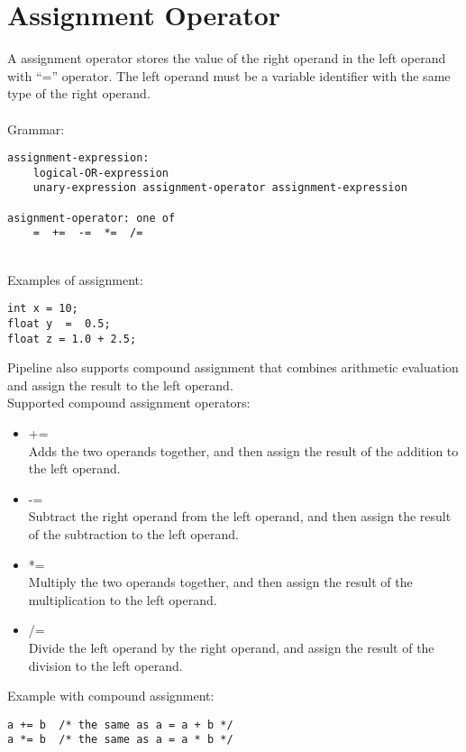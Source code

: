 \documentclass[./LRM_main.tex]{subfiles}
\begin{document}
\section{Assignment Operator}
A assignment operator stores the value of the right operand in the left operand with “=” operator. The left operand must be a variable identifier with the same type of the right operand.\\
\vspace{1 mm}\\
Grammar:
\begin{lstlisting}
assignment-expression:
    logical-OR-expression
    unary-expression assignment-operator assignment-expression
    
asignment-operator: one of
    =  +=  -=  *=  /=
\end{lstlisting}
\vspace{1 mm}\\
Examples of assignment:
\begin{lstlisting}
int x = 10; 
float y  =  0.5;  
float z = 1.0 + 2.5;
\end{lstlisting}	
Pipeline also supports compound assignment that combines arithmetic evaluation and assign the result to the left operand. \\
Supported compound assignment operators: \\
\begin{itemize}
\item +=\\
Adds the two operands together, and then assign the result of the addition to the left operand.\\
\item -=\\
Subtract the right operand from the left operand, and then assign the result of the subtraction to the left operand.\\
\item *=\\
Multiply the two operands together, and then assign the result of the multiplication to the left operand.\\
\item /=\\
Divide the left operand by the right operand, and assign the result of the division to the left operand.\\
\end{itemize}
Example with compound assignment:
\begin{lstlisting}
a += b  /* the same as a = a + b */
a *= b  /* the same as a = a * b */
\end{lstlisting}
\end{document}
